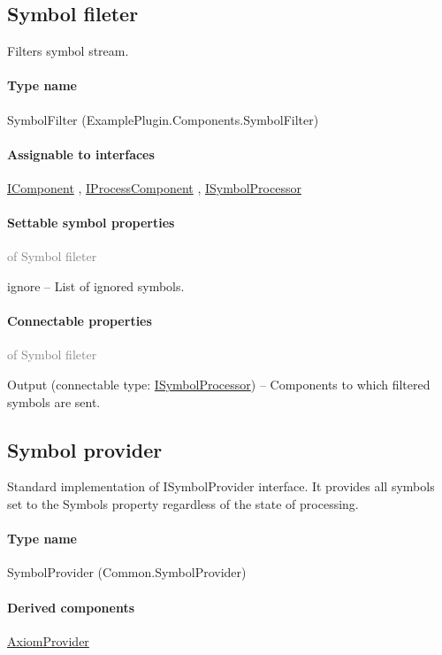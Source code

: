 \subsection{Symbol fileter}
\label{ExamplePlugin.Components.SymbolFilter}
Filters symbol stream.\paragraph{Type name}
SymbolFilter (ExamplePlugin.Components.SymbolFilter) 	\paragraph{Assignable to interfaces}
		\hyperref[Malsys.Processing.Components.IComponent]{IComponent}%
, 		\hyperref[Malsys.Processing.Components.IProcessComponent]{IProcessComponent}%
, 		\hyperref[Malsys.Processing.Components.ISymbolProcessor]{ISymbolProcessor}%
	\paragraph{Settable symbol properties}\textcolor{gray}{of Symbol fileter}
	\begin{description*}
		\item[ignore]
			-- List of ignored symbols.
	\end{description*}
	\paragraph{Connectable properties}\textcolor{gray}{of Symbol fileter}
	\begin{description*}
		\item[Output]
		(connectable type:  \hyperref[Malsys.Processing.Components.ISymbolProcessor]{ISymbolProcessor})
			-- Components to which filtered symbols are sent.
	\end{description*}
	


\subsection{Symbol provider}
\label{Malsys.Processing.Components.Common.SymbolProvider}
Standard implementation of ISymbolProvider interface.
            It provides all symbols set to the Symbols property regardless of the state of processing.\paragraph{Type name}
SymbolProvider (Common.SymbolProvider) 	\paragraph{Derived components}
		\hyperref[Malsys.Processing.Components.Common.AxiomProvider]{AxiomProvider}%
